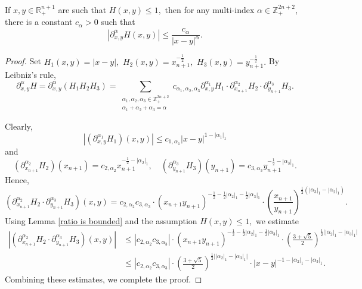 \documentclass[12pt]{amsart}
\begin{document}
\begin{lemma}\label{H derivatives lemma} If $x,y\in\mathbb{R}^{n+1}_+$ are such that $H(x,y)\leq 1,$ then for any multi-index $\alpha\in\mathbb{Z}^{2n+2}_+$, there is a constant $c_\alpha>0$ such that
$$|\partial_{x,y}^{\alpha}H(x,y)|\leq\frac{c_{\alpha}}{|x-y|^{\alpha}}.$$
\end{lemma}
\begin{proof} Set $H_1(x,y)=|x-y|,$ $H_2(x,y)=x_{n+1}^{-\frac12},$ $H_3(x,y)=y_{n+1}^{-\frac12}.$ By Leibniz's rule,
$$\partial_{x,y}^{\alpha}H=\partial_{x,y}^{\alpha}(H_1H_2H_3)=\sum_{\substack{\alpha_1,\alpha_2,\alpha_3\in\mathbb{Z}_+^{2n+2}\\ \alpha_1+\alpha_2+\alpha_3=\alpha}}c_{\alpha_1,\alpha_2,\alpha_3}\partial_{x,y}^{\alpha_1}H_1\cdot\partial_{x_{n+1}}^{\alpha_2}H_2\cdot\partial_{y_{n+1}}^{\alpha_3}H_3.$$

Clearly,
$$|(\partial_{x,y}^{\alpha_1}H_1)(x,y)|\leq c_{1,\alpha_1}|x-y|^{1-|\alpha_1|_1}$$
and
$$(\partial_{x_{n+1}}^{\alpha_2}H_2)(x_{n+1})=c_{2,\alpha_2}x_{n+1}^{-\frac12-|\alpha_2|_1},\quad (\partial_{y_{n+1}}^{\alpha_3}H_3)(y_{n+1})=c_{3,\alpha_3}y_{n+1}^{-\frac12-|\alpha_3|_1}.$$
Hence,
$$(\partial_{x_{n+1}}^{\alpha_2}H_2\cdot\partial_{y_{n+1}}^{\alpha_3}H_3)(x,y)=c_{2,\alpha_2}c_{3,\alpha_3}\cdot (x_{n+1}y_{n+1})^{-\frac12-\frac12|\alpha_2|_1-\frac12|\alpha_3|_1}\cdot (\frac{x_{n+1}}{y_{n+1}})^{\frac12(|\alpha_3|_1-|\alpha_2|_1)}.$$
Using Lemma \ref{ratio is bounded} and the assumption $H(x,y)\leq 1,$ we estimate
\begin{align*}
|(\partial_{x_{n+1}}^{\alpha_2}H_2\cdot\partial_{y_{n+1}}^{\alpha_3}H_3)(x,y)|
&\leq |c_{2,\alpha_2}c_{3,\alpha_3}|\cdot (x_{n+1}y_{n+1})^{-\frac12-\frac12|\alpha_2|_1-\frac12|\alpha_3|_1}\cdot (\frac{3+\sqrt{5}}{2})^{\frac12\big||\alpha_2|_1-|\alpha_3|_1\big|}\\
&\leq |c_{2,\alpha_2}c_{3,\alpha_3}|\cdot (\frac{3+\sqrt{5}}{2})^{\frac12\big||\alpha_2|_1-|\alpha_3|_1\big|}\cdot |x-y|^{-1-|\alpha_2|_1-|\alpha_3|_1}.
\end{align*}	
Combining these estimates, we complete the proof.
\end{proof}
\end{document}
